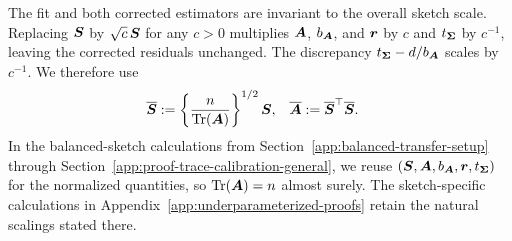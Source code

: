 \documentclass{article}
\theoremstyle{plain} %
\theoremstyle{definition} %
\theoremstyle{definition} %
\begin{document}
The fit and both corrected estimators are invariant to the overall
sketch scale. Replacing $\boldsymbol{S}$ by $\sqrt c\,\boldsymbol{S}$ for any $c>0$ multiplies
$\boldsymbol{A}$, $b_{\boldsymbol{A}}$, and $\boldsymbol{r}$ by $c$ and $t_{\boldsymbol{\Sigma}}$ by $c^{-1}$,
leaving the corrected residuals unchanged. The discrepancy
$t_{\boldsymbol{\Sigma}}-d/b_{\boldsymbol{A}}$ scales by $c^{-1}$. We therefore use
\begin{align*}
    \overline{\boldsymbol{S}}
    &:=\left\{\frac{n}{\operatorname{Tr}(\boldsymbol{A})}\right\}^{1/2}\boldsymbol{S},
    &\overline{\boldsymbol{A}}&:=\overline{\boldsymbol{S}}^{\top}\overline{\boldsymbol{S}}.
\end{align*}
In the balanced-sketch calculations from
Section~\ref{app:balanced-transfer-setup} through
Section~\ref{app:proof-trace-calibration-general}, we reuse
$(\boldsymbol{S},\boldsymbol{A},b_{\boldsymbol{A}},\boldsymbol{r},t_{\boldsymbol{\Sigma}})$ for the normalized quantities,
so $\operatorname{Tr}(\boldsymbol{A})=n$ almost surely. The sketch-specific calculations in
Appendix~\ref{app:underparameterized-proofs} retain the natural scalings
stated there.
\end{document}
